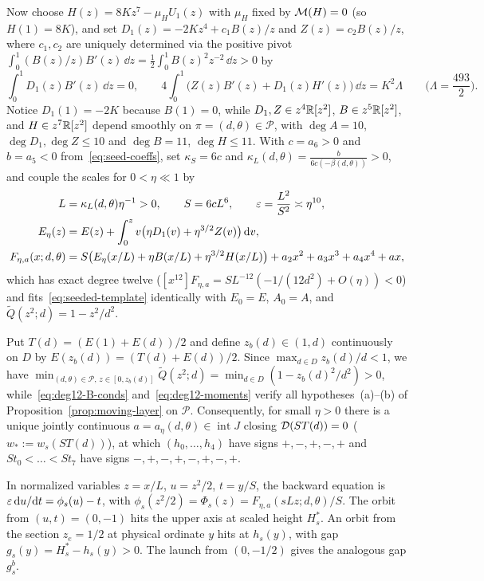 Now choose $H(z)=8Kz^7-\mu_H U_1(z)$ with $\mu_H$ fixed by $\mathcal{M}(H)=0$ (so $H(1)=8K$), and set $D_1(z)=-2Kz^4+c_1 B(z)/z$ and $Z(z)=c_2 B(z)/z$, where $c_1,c_2$ are uniquely determined via the positive pivot $\int_0^1(B(z)/z)B'(z)\,\dd z=\frac12\int_0^1 B(z)^2 z^{-2}\,\dd z>0$ by
\begin{equation}\label{eq:deg12-moments}
  \int_0^1 D_1(z)B'(z)\,\dd z = 0,\qquad 4\int_0^1\big(Z(z)B'(z)+D_1(z)H'(z)\big)\,\dd z = K^2\Lambda\qquad\Big(\Lambda=\frac{493}{2}\Big).
\end{equation}
Notice $D_1(1)=-2K$ because $B(1)=0$, while $D_1,Z\in z^4\mathbb{R}[z^2]$, $B\in z^5\mathbb{R}[z^2]$, and $H\in z^7\mathbb{R}[z^2]$ depend smoothly on $\pi=(d,\theta)\in\mathcal{P}$, with $\deg A=10$, $\deg D_1,\deg Z\le10$ and $\deg B=11$, $\deg H\le 11$. With $c=a_6>0$ and $b=a_5<0$ from~\eqref{eq:seed-coeffs}, set $\kappa_S=6c$ and $\kappa_L(d,\theta)=\frac{b}{6c(-\beta(d,\theta))}>0$, and couple the scales for $0<\eta\ll 1$ by
\begin{equation}\label{eq:deg12-poly}
  \begin{aligned}
    L &= \kappa_L(d,\theta)\eta^{-1} > 0,\qquad S = 6c L^6,\qquad \varepsilon = \frac{L^2}{S^2}\asymp\eta^{10},\\
    E_\eta(z) &= E(z) + \int_0^z v\big(\eta D_1(v)+\eta^{3/2}Z(v)\big)\,\mathrm{d} v,\\
    F_{\eta,a}(x;d,\theta) &= S\big(E_\eta(x/L)+\eta B(x/L)+\eta^{3/2}H(x/L)\big) + a_2 x^2 + a_3 x^3 + a_4 x^4 + ax,
  \end{aligned}
\end{equation}
which has exact degree twelve ($[x^{12}]F_{\eta,a}=SL^{-12}(-1/(12d^2)+O(\eta))<0$) and fits~\eqref{eq:seeded-template} identically with $E_0=E$, $A_0=A$, and $\widetilde Q(z^2;d)=1-z^2/d^2$.

Put $T(d)=(E(1)+E(d))/2$ and define $z_b(d)\in(1,d)$ continuously on $D$ by $E(z_b(d))=(T(d)+E(d))/2$. Since $\max_{d\in D} z_b(d)/d<1$, we have $\min_{(d,\theta)\in\mathcal{P},\,z\in[0,z_b(d)]}\widetilde Q(z^2;d)=\min_{d\in D}(1-z_b(d)^2/d^2)>0$, while~\eqref{eq:deg12-B-conds} and~\eqref{eq:deg12-moments} verify all hypotheses~(a)--(b) of Proposition~\ref{prop:moving-layer} on $\mathcal{P}$. Consequently, for small $\eta>0$ there is a unique jointly continuous $a=a_\eta(d,\theta)\in\operatorname{int}J$ closing $\mathcal{D}(ST(d))=0$ ($w_*:=w_s(ST(d))$), at which $(h_0,\dots,h_4)$ have signs $+,-,+,-,+$ and $St_0<\dots<St_7$ have signs $-,+,-,+,-,+,-,+$.

In normalized variables $z=x/L$, $u=z^2/2$, $t=y/S$, the backward
equation is $\varepsilon\,\mathrm{d} u/\mathrm{d} t=\phi_s(u)-t$, with
$\phi_s(z^2/2)=\Phi_s(z)=F_{\eta,a}(sLz;d,\theta)/S$.
The orbit from $(u,t)=(0,-1)$ hits the upper axis at scaled height
$H_s^*$. An orbit from the section $z_e=1/2$ at physical ordinate $y$
hits at $h_s(y)$, with gap $g_s(y)=H_s^*-h_s(y)>0$. The launch from
$(0,-1/2)$ gives the analogous gap $g_s^b$.

